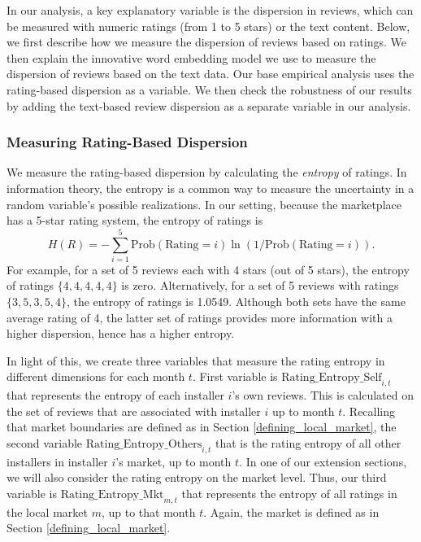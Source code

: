\documentclass[msom,blindrev]{informs3}
\begin{document}
In our analysis, a key explanatory variable is the dispersion in reviews, which can be measured with numeric ratings (from 1 to 5 stars) or the text content. Below, we first describe how we measure the dispersion of reviews based on ratings. We then explain the innovative word embedding model we use to measure the dispersion of reviews based on the text data. Our base empirical analysis uses the rating-based dispersion as a variable. We then check the robustness of our results by adding the text-based review dispersion as a separate variable in our analysis.

\subsubsection{Measuring Rating-Based Dispersion} \label{Subsec: Define Ent}
We measure the rating-based dispersion by calculating the \emph{entropy} of ratings. In information theory, the entropy is a common way to measure  the uncertainty in a random variable's possible realizations. In our setting, because the marketplace has a 5-star rating system, the entropy of ratings is
\begin{equation}\label{def: entropy}
H(R)=-\sum_{i=1}^{5} \text{Prob}(\text{Rating}=i) \ln(1/\text{Prob}(\text{Rating}=i)).
\end{equation}
For example, for a set of 5 reviews each with 4 stars (out of 5 stars), the entropy of ratings $\{4,4,4,4,4\}$ is zero. Alternatively, for a set of 5 reviews with ratings $\{3,5,3,5,4\}$, the entropy of ratings is 1.0549. Although both sets have the same average rating of 4, the latter set of ratings provides more information with a higher dispersion, hence has a higher entropy.


In light of this, we create three variables that measure the rating entropy in different dimensions for each month $t$. First variable is $\text{Rating\_Entropy\_Self}_{i,t}$ that represents the entropy of each installer $i$'s own reviews. This is calculated on the set of reviews that are associated with installer $i$ up to month $t$. Recalling that market boundaries are defined as in Section \ref{defining_local_market}, the second variable $\text{Rating\_Entropy\_Others}_{i,t}$ that is the rating entropy of all other installers in installer $i$'s market, up to month $t$. In one of our extension sections, we will also consider the rating entropy on the market level. Thus, our third variable is $\text{Rating\_Entropy\_Mkt}_{m,t}$ that represents the entropy of all ratings in the local market $m$, up to that month $t$.  Again, the market is defined as in Section \ref{defining_local_market}.\\
\end{document}
